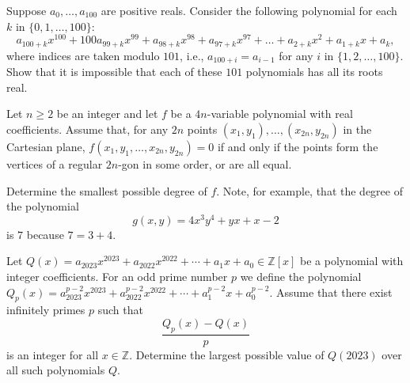 %	


\begin{question}[name={2023 India National Olympiad, \href{https://artofproblemsolving.com/community/c6h2995077p26888629}{Problem 2}}]
	Suppose $a_0,\ldots, a_{100}$ are positive reals. Consider the following polynomial for each $k$ in $\{0,1,\ldots, 100\}$:
	$$a_{100+k}x^{100}+100a_{99+k}x^{99}+a_{98+k}x^{98}+a_{97+k}x^{97}+\dots+a_{2+k}x^2+a_{1+k}x+a_k,$$where indices are taken modulo $101$, i.e., $a_{100+i}=a_{i-1}$ for any $i$ in $\{1,2,\dots, 100\}$. Show that it is impossible that each of these $101$ polynomials has all its roots real.
\end{question}

%	


\begin{question}[name={2023 Romanian Masters in Mathematics, \href{https://artofproblemsolving.com/community/c6h3024172p27195414}{Problem 3}}]
	Let $n\geq 2$ be an integer and let $f$ be a $4n$-variable polynomial with real coefficients. Assume that, for any $2n$ points $(x_1,y_1),\dots,(x_{2n},y_{2n})$ in the Cartesian plane, $f(x_1,y_1,\dots,x_{2n},y_{2n})=0$ if and only if the points form the vertices of a regular $2n$-gon in some order, or are all equal.
	
	Determine the smallest possible degree of $f$. Note, for example, that the degree of the polynomial $$g(x,y)=4x^3y^4+yx+x-2$$ is $7$ because $7=3+4$.
\end{question}


%	


\begin{question}[name={2023 Macedonian Team Selection Test, \href{https://artofproblemsolving.com/community/c6h3076286p27781633}{Problem 5}}]
	Let $Q(x) = a_{2023}x^{2023}+a_{2022}x^{2022}+\cdots+a_{1}x+a_{0} \in \mathbb{Z}[x]$ be a polynomial with integer coefficients. For an odd prime number $p$ we define the polynomial $Q_{p}(x) = a_{2023}^{p-2}x^{2023}+a_{2022}^{p-2}x^{2022}+\cdots+a_{1}^{p-2}x+a_{0}^{p-2}.$
	Assume that there exist infinitely primes $p$ such that
	$$\frac{Q_{p}(x)-Q(x)}{p}$$is an integer for all $x \in \mathbb{Z}$. Determine the largest possible value of $Q(2023)$ over all such polynomials $Q$.
\end{question}


